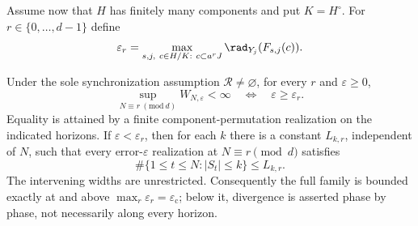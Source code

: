Assume now that $H$ has finitely many components and put $K=H^\circ$. For $r\in\{0,\ldots,d-1\}$ define
\begin{equation}\label{eq:phaseradius55}
 \varepsilon_r=\max_{s,j,\ c\in H/K:\ c\subset a^rJ}
                    \rad_{Y_j}(F_{s,j}(c)).
\end{equation}
\begin{theorem}\label{thm:phases55}
Under the sole synchronization assumption $\mathcal R\ne\varnothing$, for every $r$ and $\varepsilon\ge0$,
\[
 \sup_{N\equiv r\ (\mathrm{mod}\ d)}W_{N,\varepsilon}<\infty
             \quad\Longleftrightarrow\quad
             \varepsilon\ge\varepsilon_r.
\]
Equality is attained by a finite component-permutation realization on the indicated horizons. If $\varepsilon<\varepsilon_r$, then for each $k$ there is a constant $L_{k,r}$, independent of $N$, such that every error-$\varepsilon$ realization at $N\equiv r\pmod d$ satisfies
\[
                 \#\{1\le t\le N:|S_t|\le k\}\le L_{k,r}.
\]
The intervening widths are unrestricted. Consequently the full family is bounded exactly at and above $\max_r\varepsilon_r=\varepsilon_{\mathrm c}$; below it, divergence is asserted phase by phase, not necessarily along every horizon.
\end{theorem}
